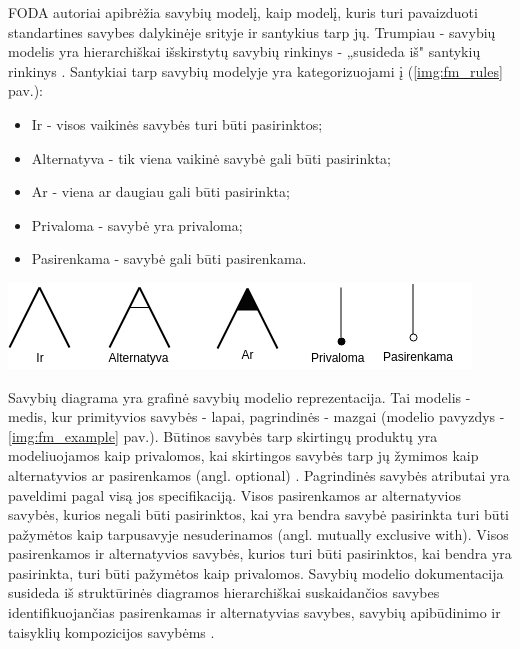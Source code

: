 \documentclass{VUMIFPSbakalaurinis}
\begin{document}
FODA \cite{Kang1990} autoriai apibrėžia savybių modelį, kaip modelį, kuris turi pavaizduoti standartines savybes dalykinėje srityje ir santykius tarp jų. Trumpiau - savybių modelis yra hierarchiškai išskirstytų savybių rinkinys - „susideda iš" santykių rinkinys \cite{Kang1990, Batory2005}. Santykiai tarp savybių  modelyje yra kategorizuojami į (\ref{img:fm_rules} pav.):
\begin{itemize}[topsep=0pt,itemsep=-1ex,partopsep=1ex,parsep=1ex]
\item Ir - visos vaikinės savybės turi būti pasirinktos;
\item Alternatyva - tik viena vaikinė savybė gali būti pasirinkta;
\item Ar - viena ar daugiau gali būti pasirinkta;
\item Privaloma - savybė yra privaloma;
\item Pasirenkama - savybė gali būti pasirenkama.
\end{itemize}


\begin{center}
    \includegraphics[scale=0.75]{img/feature_model_rules}
    \label{img:fm_rules}

\end{center}

Savybių diagrama yra grafinė savybių modelio reprezentacija. Tai modelis - medis, kur primityvios savybės - lapai, pagrindinės - mazgai (modelio pavyzdys - \ref{img:fm_example} pav.). Būtinos savybės tarp skirtingų produktų yra modeliuojamos kaip privalomos, kai skirtingos savybės tarp jų žymimos kaip alternatyvios ar pasirenkamos (angl. optional) \cite{Batory2005}. Pagrindinės savybės atributai yra paveldimi pagal visą jos specifikaciją. Visos pasirenkamos ar alternatyvios savybės, kurios negali būti pasirinktos, kai yra bendra savybė pasirinkta turi būti pažymėtos kaip tarpusavyje nesuderinamos (angl. mutually exclusive with). Visos pasirenkamos ir alternatyvios savybės, kurios turi būti pasirinktos, kai bendra yra pasirinkta, turi būti pažymėtos kaip privalomos. Savybių modelio dokumentacija susideda iš struktūrinės diagramos hierarchiškai suskaidančios savybes identifikuojančias pasirenkamas ir alternatyvias savybes, savybių apibūdinimo ir taisyklių kompozicijos savybėms \cite{Kang1990}.
\end{document}
